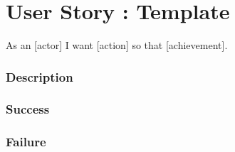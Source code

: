 \section{User Story : Template}
As an [actor] I want [action] so that [achievement].

\subsubsection{Description}

\subsubsection{Success}

\subsubsection{Failure}